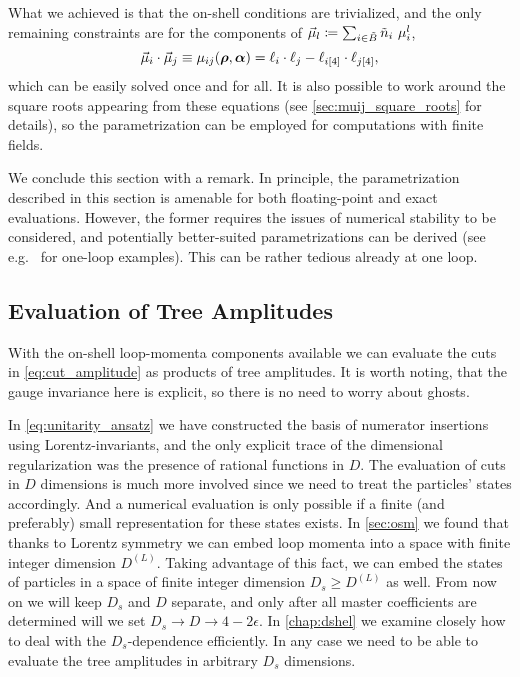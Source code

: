 What we achieved is that the on-shell conditions are trivialized,
and the only remaining constraints are for the components of $\va{\mu}_l \coloneqq \sum_{i\in \tilde{B}} \tilde{n}_i~\mu^l_{i}$,
\begin{equation}
  \va{\mu}_i \cdot \va{\mu}_j  \equiv  \mu_{ij} (\vb*{\rho},\vb*{\alpha}) = \ell_i\cdot \ell_j - \ell_{i[4]}\cdot \ell_{j[4]},
\end{equation}
which can be easily solved once and for all.
It is also possible to work around the square roots appearing from these equations (see \cref{sec:muij_square_roots} for details),
so the parametrization can be employed for computations with finite fields.

We conclude this section with a remark.
In principle, the parametrization described in this
section is amenable for both floating-point and exact evaluations.
However, the former requires the issues of numerical stability to be considered,
and potentially better-suited parametrizations can be derived (see e.g.\ \cite{Kilgore:2007qr,Berger:2008sj} for one-loop examples).
This can be rather tedious already at one loop.

\subsection{Evaluation of Tree Amplitudes}
\label{sec:evaluation_of_tree_amplitudes}

With the on-shell loop-momenta components available
we can evaluate the cuts in \cref{eq:cut_amplitude} as products
of tree amplitudes. It is worth noting, that the gauge invariance here is explicit, so 
there is no need to worry about ghosts.

In \cref{eq:unitarity_ansatz} we have constructed  the basis of numerator insertions using Lorentz-invariants, and
the only explicit trace of the dimensional regularization was the presence of rational functions in $D$.
The evaluation of cuts in $D$ dimensions is much more involved since we need to treat the particles' states accordingly.
And a numerical evaluation is only possible if a finite (and preferably) small representation for these states exists.
In \cref{sec:osm} we found that thanks to Lorentz symmetry we can embed loop
momenta into a space with finite integer dimension $D^{(L)}$.
Taking advantage of this fact, we can embed the states of particles in a space of finite integer dimension $D_s\geq D^{(L)}$ as well.
From now on we will keep $D_s$ and $D$ separate,
and only after all master coefficients are determined will we set $D_s\to D\to 4-2\epsilon$.
In \cref{chap:dshel} we examine closely how to deal with the $D_s$-dependence efficiently.
In any case we need to be able to evaluate the tree amplitudes in arbitrary $D_s$ dimensions.

